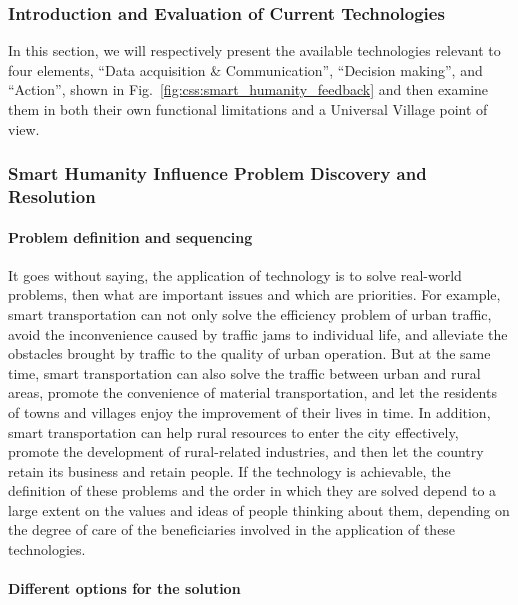 \documentclass[letterpaper, twocolumn, 10pt, conference]{IEEEtran}
\begin{document}
\subsubsection{Introduction and Evaluation of Current Technologies}
\label{sssec:css:smart_humanity:evaluation}

In this section, we will respectively present the available technologies relevant to four elements, \enquote{Data acquisition \& Communication}, \enquote{Decision making}, and  \enquote{Action},  shown in Fig.~\ref{fig:css:smart_humanity_feedback} and then examine them in both their own functional limitations and a Universal Village point of view.




\subsubsection{Smart Humanity Influence Problem Discovery and Resolution}
\label{sssec:css:smart_humanity:resolution}

\paragraph{Problem definition and sequencing}

It goes without saying, the application of technology is to solve real-world problems, then what are important issues and which are priorities. For example, smart transportation can not only solve the efficiency problem of urban traffic, avoid the inconvenience caused by traffic jams to individual life, and alleviate the obstacles brought by traffic to the quality of urban operation. But at the same time, smart transportation can also solve the traffic between urban and rural areas, promote the convenience of material transportation, and let the residents of towns and villages enjoy the improvement of their lives in time. In addition, smart transportation can help rural resources to enter the city effectively, promote the development of rural-related industries, and then let the country retain its business and retain people. If the technology is achievable, the definition of these problems and the order in which they are solved depend to a large extent on the values and ideas of people thinking about them, depending on the degree of care of the beneficiaries involved in the application of these technologies.

\paragraph{Different options for the solution}
\end{document}
